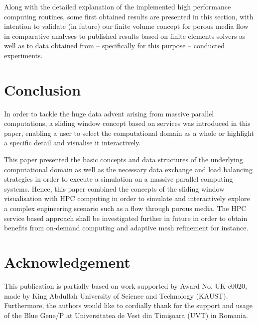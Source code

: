 \documentclass[10pt, conference]{IEEEtran}
\newcommand{\TODO}[1]{\textcolor{red}{{\bf TODO}: #1}}
\begin{document}
 


Along with the detailed explanation of the implemented high performance computing routines, some first obtained results are presented in this section, with intention to validate (in future) our finite
volume concept for porous media flow in comparative analyses to published results based on finite elements solvers as well as to data obtained from -- specifically for this purpose -- conducted
experiments.


\section{Conclusion}

In order to tackle the huge data advent arising from massive parallel computations, a sliding window concept based on services was introduced in this paper, enabling a user to select the
computational domain as a whole or highlight a specific detail and visualise it interactively.

This paper presented the basic concepts and data structures of the underlying computational domain as well as the necessary data exchange and load balancing strategies in order to execute
a simulation on a massive parallel computing systems. Hence, this paper combined the concepts of the sliding window visualisation with HPC computing in order to simulate and interactively
explore a complex engineering scenario such as a flow through porous media. The HPC service based approach shall be investigated further in future in order to obtain benefits from
on-demand computing and adaptive mesh refinement for instance.


\section{Acknowledgement} %

This publication is partially based on work supported by Award No. UK-c0020, made by King Abdullah University of Science and Technology (KAUST). Furthermore, the authors would like to
cordially thank for the support and usage of the Blue Gene/P at Universitatea de Vest din Timi\c{s}oara (UVT) in Romania. 



%

\end{document}
